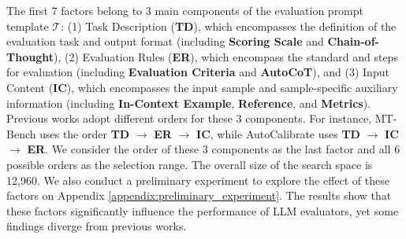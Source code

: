 

The first 7 factors belong to 3 main components of the evaluation prompt template $ \mathcal{T} $: 
(1) Task Description (\textbf{TD}), which encompasses the definition of the evaluation task and output format (including \textbf{Scoring Scale} and \textbf{Chain-of-Thought}),
(2) Evaluation Rules (\textbf{ER}), which encompass the standard and steps for evaluation (including \textbf{Evaluation Criteria} and \textbf{AutoCoT}), 
and (3) Input Content (\textbf{IC}), which encompasses the input sample and sample-specific auxiliary information (including \textbf{In-Context Example}, \textbf{Reference}, and \textbf{Metrics}). 
Previous works adopt different orders for these 3 components.
For instance, MT-Bench \cite{zheng2023judging} uses the order \textbf{TD} $\rightarrow$ \textbf{ER} $\rightarrow$ \textbf{IC}, while AutoCalibrate \cite{liu-etal-2024-calibrating} uses \textbf{TD} $\rightarrow$ \textbf{IC} $\rightarrow$ \textbf{ER}. 
We consider the order of these 3 components as the last factor and all 6 possible orders as the selection range.
The overall size of the search space is 12,960. 
We also conduct a preliminary experiment to explore the effect of these factors on Appendix \ref{appendix:preliminary_experiment}.
The results show that these factors significantly influence the performance of LLM evaluators, yet some findings diverge from previous works. 

% 




